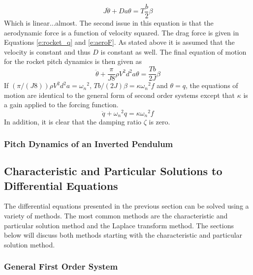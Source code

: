 \begin{equation}
    J\ddot{\theta} + D a \theta = T \frac{b}{2} \beta
\end{equation}
Which is linear...almost. The second issue in this equation is that the aerodynamic force is a function of velocity squared. The drag force is given in Equations \ref{e:rocket_q} and \ref{e:aeroF}. As stated above it is assumed that the velocity is constant and thus $D$ is constant as well. The final equation of motion for the rocket pitch dynamics is then given as
\begin{equation}
    \ddot{\theta} + \frac{\pi}{J8}\rho V^2 d^2 a \theta = \frac{Tb}{2J} \beta
\end{equation}
If $(\pi/(J8))\rho V^2 d^2 a = {\omega_n}^2$, $Tb/(2J) \beta = \kappa {\omega_n}^2 f$ and $\theta = q$, the equations of motion are identical to the general form of second order systems except that $\kappa$ is a gain applied to the forcing function.  
\begin{equation}
    \ddot{q} + {\omega_n}^2 q = \kappa {\omega_n}^2 f
\end{equation}
In addition, it is clear that the damping ratio $\zeta$ is zero. 

\subsubsection{Pitch Dynamics of an Inverted Pendulum}

\subsection{Characteristic and Particular Solutions to Differential Equations}

The differential equations presented in the previous section can be solved using a variety of methods. The most common methods are the characteristic and particular solution method and the Laplace transform method. The sections below will discuss both methods starting with the characteristic and particular solution method.

\subsubsection{General First Order System}

